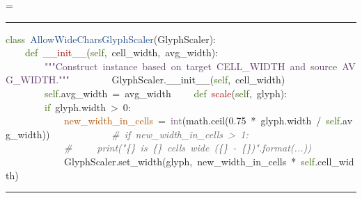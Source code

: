 \documentclass{article}
\makeatletter
\newcommand*{\ESHFontSize}{}
\newcommand*{\ESHFontFamily}{\ttfamily}
\newcommand*{\ESHBlockFontSize}{\ESHFontSize}
\newcommand*{\ESHBlockFontFamily}{\ESHFontFamily}
\newcommand*{\ESHBlockFont}{\ESHBlockFontSize\ESHBlockFontFamily}
\newcommand*{\ESHFallbackFontFamily}{\ESHFontFamily}
\newcommand*{\ESHFallbackFont}{\ESHFallbackFontFamily}
\newcommand*{\ESHNoHyphens}{\hyphenpenalty=10000}
\newcommand*{\ESHConstantSpace}{\spaceskip=\fontdimen2\font\xspaceskip=0pt}
\newcommand*{\ESHCenterInWidthOf}[2]
  {\settowidth\ESHtempdim{#1}%
   \makebox[\ESHtempdim][c]{#2}}
\newcommand*{\ESHIfFontChar}[1]
  {\iffontchar\font`#1{#1}\else{\ESHFallbackFont#1}\fi}
\def\ESHWithFallback#1{\ESHFallbackFont#1}}
\def\ESHWithFallback#1{\ESHIfFontChar{#1}}}}
\def\ESHWithFallback#1{%
     \ifnum\XeTeXfonttype\font>0%
       \ESHIfFontChar{#1}%
     \else%
       \setbox0=\hbox{\tracinglostchars=0\kern1sp#1\expandafter}%
       \ifnum\lastkern=1{\ESHFallbackFont#1}\else{#1}\fi
     \fi}}
\DeclareRobustCommand*{\ESHBlockSpecialChar}[1]
  {{\ESHCenterInWidthOf{\ESHBlockFontFamily{a}}{\ESHBlockFontFamily\ESHWithFallback{#1}}}}
\DeclareRobustCommand*{\ESHBlockUnicodeSubstitution}[1]
  {{\ESHCenterInWidthOf{\ESHBlockFontFamily{a}}{\ESHBlockFontFamily#1}}}
\DeclareRobustCommand*{\ESHInlineRaise}[2]
  {\raisebox{#1}{\relsize{-2}#2}}
\DeclareRobustCommand*{\ESHBlockRaise}[2]
  {\rlap{\ESHInlineRaise{#1}{#2}}\hphantom{#2}}
\newlength{\ESHBaselineskip}
\DeclareRobustCommand*{\ESHBlockStrut}[1]
  {\rule{0pt}{#1\ESHBaselineskip}}
\newcommand*{\ESHBlockSlantItalic}[1]{{\itshape{#1}}} %
\newcommand*{\ESHNonbreakingSpace}{~}
\let\ESHSpecialChar\ignorespaces%
\let\ESHUnicodeSubstitution\ignorespaces%
\let\ESHRaise\ignorespaces%
\let\ESHBol\ignorespaces%
\let\ESHEol\ignorespaces%
\let\ESHSpace\ignorespaces%
\let\ESHDash\ignorespaces%
\let\ESHSlantItalic\ignorespaces%
\DeclareRobustCommand*{\ESHBlockInternalSetup}
  {\def\ESHSpecialChar{\ESHBlockSpecialChar}\def\ESHUnicodeSubstitution{\ESHBlockUnicodeSubstitution}%
   \def\ESHRaise{\ESHBlockRaise}\def\ESHSlantItalic{\ESHBlockSlantItalic}%
   \setlength{\ESHBaselineskip}{\baselineskip}\def\ESHStrut{\ESHBlockStrut}%
   \def\ESHBol{\-}\def\ESHEol{\newline}\def\ESHSpace{\ESHNonbreakingSpace}\def\ESHDash{\hbox{-}\nobreak}}
\newcommand*{\ESHBlockBasicSetup}
  {\setlength{\parindent}{0pt}\raggedright\ESHNoHyphens%
   \ESHBlockFont\ESHConstantSpace}
\newcommand*{\ESHHook}{}
\newcommand*{\ESHBlockHook}{\ESHHook}
\newlength{\ESHSkip}
\newcommand*{\ESHNoBreakAddVSpace}[1]{\addpenalty{\@M}\addvspace{#1}}
\newenvironment{ESHBlock}
  {\par\ESHNoBreakAddVSpace{\ESHSkip}\bgroup\ESHBlockInternalSetup\ESHBlockBasicSetup\ESHBlockHook}
  {\par\egroup\addvspace{\ESHSkip}}
\renewcommand{\ESHFontFamily}{\UbuntuMono}
\renewcommand{\ESHFallbackFontFamily}{\XITSMath}
\renewenvironment{ESHBlock}{%
  \par\ESHNoBreakAddVSpace{\ESHSkip}\bgroup\ESHBlockInternalSetup\ESHBlockBasicSetup%
  \hrule\addvspace{0.5em}%
}{%
  \par\egroup\addvspace{0.5em}\hrule\addvspace{2\ESHSkip}%
}
\makeatother
\begin{document}
\begin{ESHBlock}
\ESHBol{}\textcolor[HTML]{346604}{class}\ESHSpace{}\textcolor[HTML]{204A87}{AllowWideCharsGlyphScaler}(GlyphScaler):\ESHEol
\ESHBol{}\ESHSpace{}\ESHSpace{}\ESHSpace{}\ESHSpace{}\textcolor[HTML]{346604}{def}\ESHSpace{}\textcolor[HTML]{A40000}{\_\_init\_\_}(\textcolor[HTML]{346604}{self},\ESHSpace{}cell\_width,\ESHSpace{}avg\_width):\ESHEol
\ESHBol{}\ESHSpace{}\ESHSpace{}\ESHSpace{}\ESHSpace{}\ESHSpace{}\ESHSpace{}\ESHSpace{}\ESHSpace{}\textcolor[HTML]{5C3566}{"""Construct\ESHSpace{}instance\ESHSpace{}based\ESHSpace{}on\ESHSpace{}target\ESHSpace{}CELL\_WIDTH\ESHSpace{}and\ESHSpace{}source\ESHSpace{}AVG\_WIDTH."""}\ESHEol
\ESHBol{}\ESHSpace{}\ESHSpace{}\ESHSpace{}\ESHSpace{}\ESHSpace{}\ESHSpace{}\ESHSpace{}\ESHSpace{}GlyphScaler.\_\_init\_\_(\textcolor[HTML]{346604}{self},\ESHSpace{}cell\_width)\ESHEol
\ESHBol{}\ESHSpace{}\ESHSpace{}\ESHSpace{}\ESHSpace{}\ESHSpace{}\ESHSpace{}\ESHSpace{}\ESHSpace{}\textcolor[HTML]{346604}{self}.avg\_width\ESHSpace{}=\ESHSpace{}avg\_width\ESHEol
\ESHBol{}\mbox{}\ESHEol
\ESHBol{}\ESHSpace{}\ESHSpace{}\ESHSpace{}\ESHSpace{}\textcolor[HTML]{346604}{def}\ESHSpace{}\textcolor[HTML]{A40000}{scale}(\textcolor[HTML]{346604}{self},\ESHSpace{}glyph):\ESHEol
\ESHBol{}\ESHSpace{}\ESHSpace{}\ESHSpace{}\ESHSpace{}\ESHSpace{}\ESHSpace{}\ESHSpace{}\ESHSpace{}\textcolor[HTML]{346604}{if}\ESHSpace{}glyph.width\ESHSpace{}{>}\ESHSpace{}0:\ESHEol
\ESHBol{}\ESHSpace{}\ESHSpace{}\ESHSpace{}\ESHSpace{}\ESHSpace{}\ESHSpace{}\ESHSpace{}\ESHSpace{}\ESHSpace{}\ESHSpace{}\ESHSpace{}\ESHSpace{}\textcolor[HTML]{B35000}{new\_width\_in\_cells}\ESHSpace{}=\ESHSpace{}\textcolor[HTML]{75507B}{int}(math.ceil(0.75\ESHSpace{}*\ESHSpace{}glyph.width\ESHSpace{}/\ESHSpace{}\textcolor[HTML]{346604}{self}.avg\_width))\ESHEol
\ESHBol{}\ESHSpace{}\ESHSpace{}\ESHSpace{}\ESHSpace{}\ESHSpace{}\ESHSpace{}\ESHSpace{}\ESHSpace{}\ESHSpace{}\ESHSpace{}\ESHSpace{}\ESHSpace{}\ESHSlantItalic{\textcolor[HTML]{5F615C}{\#\ESHSpace{}if\ESHSpace{}new\_width\_in\_cells\ESHSpace{}{>}\ESHSpace{}1:}}\ESHEol
\ESHBol{}\ESHSpace{}\ESHSpace{}\ESHSpace{}\ESHSpace{}\ESHSpace{}\ESHSpace{}\ESHSpace{}\ESHSpace{}\ESHSpace{}\ESHSpace{}\ESHSpace{}\ESHSpace{}\ESHSlantItalic{\textcolor[HTML]{5F615C}{\#\ESHSpace{}\ESHSpace{}\ESHSpace{}\ESHSpace{}\ESHSpace{}print("\{\}\ESHSpace{}is\ESHSpace{}\{\}\ESHSpace{}cells\ESHSpace{}wide\ESHSpace{}(\{\}\ESHSpace{}\ESHDash{}{>}\ESHSpace{}\{\})".format(...))}}\ESHEol
\ESHBol{}\ESHSpace{}\ESHSpace{}\ESHSpace{}\ESHSpace{}\ESHSpace{}\ESHSpace{}\ESHSpace{}\ESHSpace{}\ESHSpace{}\ESHSpace{}\ESHSpace{}\ESHSpace{}GlyphScaler.set\_width(glyph,\ESHSpace{}new\_width\_in\_cells\ESHSpace{}*\ESHSpace{}\textcolor[HTML]{346604}{self}.cell\_width)
\end{ESHBlock}
\end{document}
